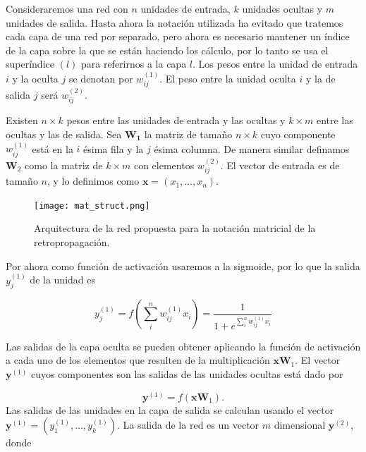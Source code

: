Consideraremos una red con $n$ unidades de entrada, $k$ unidades ocultas y $m$ unidades de salida. 
Hasta ahora la notación utilizada ha evitado que tratemos cada capa de una red
por separado, pero ahora es necesario mantener un índice de la capa sobre la que
se están haciendo los cálculo, por lo tanto se usa el superíndice $(l)$ para referirnos
a la capa $l$.
Los pesos entre la unidad de entrada $i$ y la oculta $j$ se denotan por $w_{ij}^{(1)}$. El peso 
entre la unidad oculta $i$ y la de salida $j$ será $w_{ij}^{(2)}$.



Existen $n \times k$ pesos entre las unidades de entrada y las ocultas y
$k \times m$ entre las ocultas y las de salida. Sea $\mathbf{W_1}$ la matriz de
tamaño $n \times k$ cuyo componente $w_{ij}^{(1)}$ está en la $i$ ésima
fila y la $j$ ésima columna. De manera similar definamos $\mathbf{W}_2$ 
como la matriz de $k \times m$ con elementos $w_{ij}^{(2)}$. 
El vector de entrada es de tamaño $n$,  y lo definimos como $\mathbf{x} = (x_1, \dots, x_n)$. 

\begin{figure}
    \centering
    \texttt{[image: mat\_struct.png]}
    \caption{Arquitectura de la red propuesta para la notación matricial de la retropropagación.}
    \label{fig:mat_mult_struct}
\end{figure}

Por ahora como función de activación usaremos a la sigmoide, por lo que la salida $y_j^{(1)}$ de la
unidad es

\[
y_j^{(1)} = f(\sum_{i}^{n} w_{ij}^{(1)}x_i) = \frac{1}{1+e^{\sum_{i}^{n} w_{ij}^{(1)}x_i}}
\]
 
Las salidas de la capa oculta se pueden obtener aplicando la función de activación a cada uno de los
elementos que resulten de la multiplicación
$\mathbf{x}\mathbf{W}_1$. El vector $\mathbf{y}^{(1)}$ cuyos componentes son las salidas de las unidades
ocultas está dado por

\[
\mathbf{y}^{(1)} = f(\mathbf{x}\mathbf{W}_1).
\]
Las salidas de las unidades en la capa de salida se calculan
usando el vector $\mathbf{y}^{(1)} = (y_1^{(1)},\dots, y_k^{(1)})$. La salida de la 
red es un vector $m$ dimensional $\mathbf{y}^{(2)}$, donde

